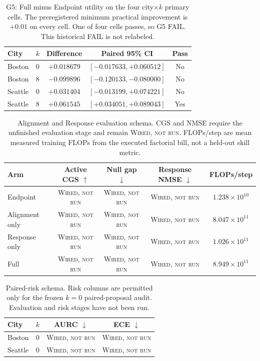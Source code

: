 \documentclass{article}
\newcommand{\wired}{\textsc{Wired, not run}}
\begin{document}
\begin{table}[h]
\caption{G5: Full minus Endpoint utility on the four city$\times k$
primary cells.  The preregistered minimum practical improvement is
$+0.01$ on every cell.  One of four cells passes, so G5 FAIL.  This
historical FAIL is not relabeled.}
\label{tab:g5}
\centering
\small
\begin{tabular}{llccc}
\toprule
City & $k$ & Difference & Paired 95\% CI & Pass \\
\midrule
Boston & 0 & $+0.018679$ & $[-0.017633,+0.060512]$ & No \\
Boston & 8 & $-0.099896$ & $[-0.120133,-0.080000]$ & No \\
Seattle & 0 & $+0.031404$ & $[-0.013199,+0.074221]$ & No \\
Seattle & 8 & $+0.061545$ & $[+0.034051,+0.089043]$ & Yes \\
\bottomrule
\end{tabular}
\end{table}

\begin{table}[h]
\caption{Alignment and Response evaluation schema.  CGS and NMSE require
the unfinished evaluation stage and remain \wired{}.  FLOPs/step are
mean measured training FLOPs from the executed factorial bill, not a
held-out skill metric.}
\label{tab:planned-arms}
\centering
\small
\begin{tabular}{lcccc}
\toprule
Arm & Active CGS $\uparrow$ & Null gap $\downarrow$ & Response NMSE $\downarrow$ & FLOPs/step \\
\midrule
Endpoint & \wired & \wired & \wired & $1.238\times 10^{10}$ \\
Alignment only & \wired & \wired & \wired & $8.047\times 10^{11}$ \\
Response only & \wired & \wired & \wired & $1.026\times 10^{11}$ \\
Full & \wired & \wired & \wired & $8.949\times 10^{11}$ \\
\bottomrule
\end{tabular}
\end{table}

\begin{table}[h]
\caption{Paired-risk schema.  Risk columns are permitted only for the
frozen $k=0$ paired-proposal audit.  Evaluation and risk stages have not
been run.}
\label{tab:planned-target}
\centering
\small
\begin{tabular}{llcc}
\toprule
City & $k$ & AURC $\downarrow$ & ECE $\downarrow$ \\
\midrule
Boston & 0 & \wired & \wired \\
Seattle & 0 & \wired & \wired \\
\bottomrule
\end{tabular}
\end{table}
\end{document}
